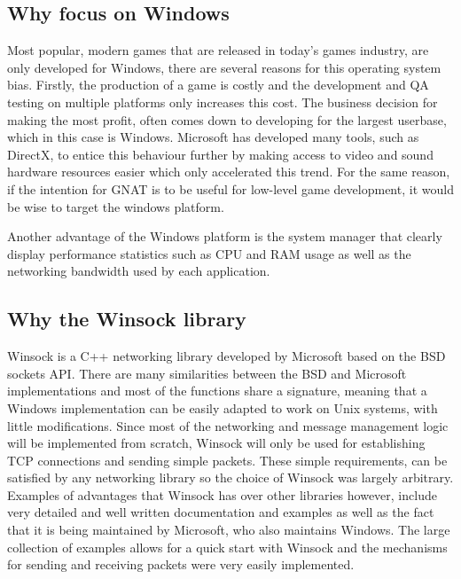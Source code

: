 \subsection{Why focus on Windows}
Most popular, modern games that are released in today's games industry, are only developed for Windows, there are several reasons for this operating system bias. Firstly, the production of a game is costly and the development and QA testing on multiple platforms only increases this cost. The business decision for making the most profit, often comes down to developing for the largest userbase, which in this case is Windows. Microsoft has developed many tools, such as DirectX, to entice this behaviour further by making access to video and sound hardware resources easier which only accelerated this trend.
For the same reason, if the intention for GNAT is to be useful for low-level game development, it would be wise to target the windows platform.

Another advantage of the Windows platform is the system manager that clearly display performance statistics such as CPU and RAM usage as well as the networking bandwidth used by each application.


\subsection{Why the Winsock library}
Winsock is a C++ networking library developed by Microsoft based on the BSD sockets API. There are many similarities between the BSD and Microsoft implementations and most of the functions share a signature, meaning that a Windows implementation can be easily adapted to work on Unix systems, with little modifications. Since most of the networking and message management logic will be implemented from scratch, Winsock will only be used for establishing TCP connections and sending simple packets. These simple requirements, can be satisfied by any networking library so the choice of Winsock was largely arbitrary. Examples of advantages that Winsock has over other libraries however, include very detailed and well written documentation and examples as well as the fact that it is being maintained by Microsoft, who also maintains Windows. The large collection of examples allows for a quick start with Winsock and the mechanisms for sending and receiving packets were very easily implemented.


\newpage
